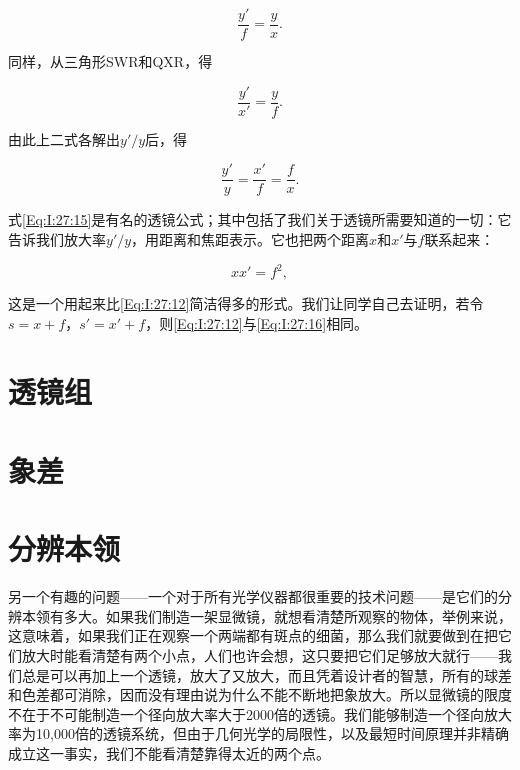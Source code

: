 \documentclass[12pt,oneside]{book}
\begin{document}
\begin{common-format}
\begin{equation}
\label{Eq:I:27:13}
\frac{y'}{f}=\frac{y}{x}.
\end{equation}

同样，从三角形SWR和QXR，得

\begin{equation}
\label{Eq:I:27:14}
\frac{y'}{x'}=\frac{y}{f}.
\end{equation}

由此上二式各解出$ y'/y $后，得

\begin{equation}
\label{Eq:I:27:15}
\frac{y'}{y}=\frac{x'}{f}=\frac{f}{x}.
\end{equation}

式\ref{Eq:I:27:15}是有名的透镜公式；其中包括了我们关于透镜所需要知道的一切：它告诉我们放大率$ y'/y $，用距离和焦距表示。它也把两个距离$ x $和$ x' $与$ f $联系起来：

\begin{equation}
\label{Eq:I:27:16}
xx'=f^2,
\end{equation}

这是一个用起来比\ref{Eq:I:27:12}简洁得多的形式。我们让同学自己去证明，若令$ s=x+f $，$ s'=x'+f $，则\ref{Eq:I:27:12}与\ref{Eq:I:27:16}相同。



\section{透镜组}



\section{象差}


\section{分辨本领}
另一个有趣的问题——一个对于所有光学仪器都很重要的技术问题——是它们的分辨本领有多大。如果我们制造一架显微镜，就想看清楚所观察的物体，举例来说，这意味着，如果我们正在观察一个两端都有斑点的细菌，那么我们就要做到在把它们放大时能看清楚有两个小点，人们也许会想，这只要把它们足够放大就行——我们总是可以再加上一个透镜，放大了又放大，而且凭着设计者的智慧，所有的球差和色差都可消除，因而没有理由说为什么不能不断地把象放大。所以显微镜的限度不在于不可能制造一个径向放大率大于2000倍的透镜。我们能够制造一个径向放大率为10,000倍的透镜系统，但由于几何光学的局限性，以及最短时间原理并非精确成立这一事实，我们不能看清楚靠得太近的两个点。


\end{common-format}
\end{document}
